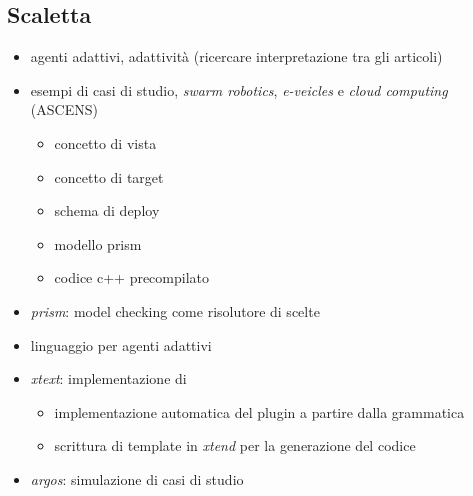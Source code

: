 \subsection{Scaletta}
\begin{itemize}
	\item agenti adattivi, adattività (ricercare interpretazione tra gli articoli)
	\item esempi di casi di studio, \emph{swarm robotics}, \emph{e-veicles} e \emph{cloud computing} (ASCENS)
	\begin{itemize}
		\item concetto di vista
		\item concetto di target
		\item schema di deploy
		\item modello prism
		\item codice c++ precompilato
	\end{itemize}
	\item \emph{prism}: model checking come risolutore di scelte
	\item linguaggio per agenti adattivi \seal{}
	\item \emph{xtext}: implementazione di \seal{}
	\begin{itemize}
		\item implementazione automatica del plugin a partire dalla grammatica
		\item scrittura di template in \emph{xtend} per la generazione del codice
	\end{itemize}
	\item \emph{argos}: simulazione di casi di studio
\end{itemize}